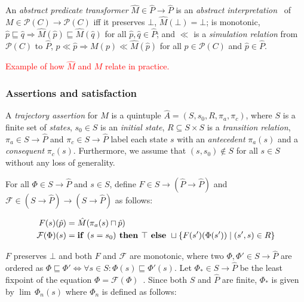 An \textit{abstract predicate transformer} $\hat M \in \hat P \rightarrow \hat P$ is an \textit{abstract interpretation}~\cite{cousot1996} of $M \in \mathcal{P}(C) \rightarrow \mathcal{P}(C)$ iff it preserves $\bot$, $\hat M(\bot) = \bot$; is monotonic, $\hat p \sqsubseteq \hat q \Rightarrow \hat M (\hat p) \sqsubseteq \hat M (\hat q)$ for all $\hat p, \hat q \in \hat P$; and $\ll$ is a \textit{simulation relation} from $\mathcal{P}(C)$ to $\hat P$, $p \ll \hat p \Rightarrow M (p) \ll \hat M (\hat p)$ for all $p \in \mathcal{P}(C)$ and $\hat p \in \hat P$.

\textcolor{red}{Example of how $\hat M$ and $M$ relate in practice.}

\subsubsection{Assertions and satisfaction}

A \textit{trajectory assertion} for $\hat M$ is a quintuple $\hat A = (S,s_{0},R,\pi_{a},\pi_{c})$, where $S$ is a finite set of \textit{states}, $s_{0} \in S$ is an \textit{initial state}, $R \subseteq S \times S$ is a \textit{transition relation}, $\pi_{a} \in S \rightarrow \hat P$ and $\pi_{c} \in S \rightarrow \hat P$ label each state $s$ with an \textit{antecedent} $\pi_{a}(s)$ and a \textit{consequent} $\pi_{c}(s)$. Furthermore, we assume that $(s,s_{0}) \notin S$ for all $s \in S$ without any loss of generality.

For all $\Phi \in S \rightarrow \hat P$ and $s \in S$, define $F \in S \rightarrow (\hat P \rightarrow \hat P)$ and $\mathcal{F} \in (S \rightarrow \hat P) \rightarrow (S \rightarrow \hat P)$ as follows:

\begin{align}
F(s)(\hat p) &= \hat M(\pi_{a}(s) \sqcap \hat p) \\
\mathcal{F}(\Phi)(s) &= \textrm{\textbf{if }} (s = s_{0}) \textrm{\textbf{ then }} \top \textrm{\textbf{ else }} \sqcup \{ F(s')(\Phi(s')) \mid (s',s) \in R \}
\end{align}

\noindent $F$ preserves $\bot$ and both $F$ and $\mathcal{F}$ are monotonic, where two $\Phi, \Phi' \in S \rightarrow \hat P$ are ordered as $\Phi \sqsubseteq \Phi' \iff \forall s \in S : \Phi(s) \sqsubseteq \Phi'(s)$. Let $\Phi_{*} \in S \rightarrow \hat P$ be the least fixpoint of the equation $\Phi = \mathcal{F}(\Phi)$~\cite{davey2002}. Since both $S$ and $\hat P$ are finite, $\Phi_{*}$ is given by $\lim \, \Phi_{n}(s)$ where $\Phi_{n}$ is defined as follows:

